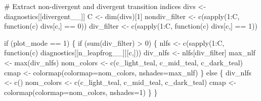 \documentclass[
  letterpaper,
  DIV=11,
  numbers=noendperiod]{scrartcl}
\newenvironment{Shaded}{\begin{snugshade}}{\end{snugshade}}
\newcommand{\BuiltInTok}[1]{\textcolor[rgb]{0.00,0.23,0.31}{#1}}
\newcommand{\CommentTok}[1]{\textcolor[rgb]{0.37,0.37,0.37}{#1}}
\newcommand{\ControlFlowTok}[1]{\textcolor[rgb]{0.00,0.23,0.31}{#1}}
\newcommand{\DecValTok}[1]{\textcolor[rgb]{0.68,0.00,0.00}{#1}}
\newcommand{\NormalTok}[1]{\textcolor[rgb]{0.00,0.23,0.31}{#1}}
\newcommand{\OperatorTok}[1]{\textcolor[rgb]{0.37,0.37,0.37}{#1}}
\newcommand{\StringTok}[1]{\textcolor[rgb]{0.13,0.47,0.30}{#1}}
\begin{document}
\begin{Shaded}
\begin{Highlighting}[]
  \CommentTok{\# Extract non{-}divergent and divergent transition indices}
\NormalTok{  divs }\OperatorTok{\textless{}{-}}\NormalTok{ diagnostics[[}\StringTok{\textquotesingle{}divergent\_\_\textquotesingle{}}\NormalTok{]]}
\NormalTok{  C }\OperatorTok{\textless{}{-}}\NormalTok{ dim(divs)[}\DecValTok{1}\NormalTok{]}
\NormalTok{  nondiv\_filter }\OperatorTok{\textless{}{-}}\NormalTok{ c(sapply(}\DecValTok{1}\NormalTok{:C, function(c) divs[c,] }\OperatorTok{==} \DecValTok{0}\NormalTok{))}
\NormalTok{  div\_filter    }\OperatorTok{\textless{}{-}}\NormalTok{ c(sapply(}\DecValTok{1}\NormalTok{:C, function(c) divs[c,] }\OperatorTok{==} \DecValTok{1}\NormalTok{))}
  
  \ControlFlowTok{if}\NormalTok{ (plot\_mode }\OperatorTok{==} \DecValTok{1}\NormalTok{) \{}
    \ControlFlowTok{if}\NormalTok{ (}\BuiltInTok{sum}\NormalTok{(div\_filter) }\OperatorTok{\textgreater{}} \DecValTok{0}\NormalTok{) \{}
\NormalTok{      nlfs }\OperatorTok{\textless{}{-}}\NormalTok{ c(sapply(}\DecValTok{1}\NormalTok{:C,}
\NormalTok{                       function(c) diagnostics[[}\StringTok{\textquotesingle{}n\_leapfrog\_\_\textquotesingle{}}\NormalTok{]][c,]))}
\NormalTok{      div\_nlfs }\OperatorTok{\textless{}{-}}\NormalTok{ nlfs[div\_filter]}
\NormalTok{      max\_nlf }\OperatorTok{\textless{}{-}} \BuiltInTok{max}\NormalTok{(div\_nlfs)}
\NormalTok{      nom\_colors }\OperatorTok{\textless{}{-}}\NormalTok{ c(c\_light\_teal, c\_mid\_teal, c\_dark\_teal)}
\NormalTok{      cmap }\OperatorTok{\textless{}{-}}\NormalTok{ colormap(colormap}\OperatorTok{=}\NormalTok{nom\_colors, nshades}\OperatorTok{=}\NormalTok{max\_nlf)}
\NormalTok{    \} }\ControlFlowTok{else}\NormalTok{ \{}
\NormalTok{      div\_nlfs }\OperatorTok{\textless{}{-}}\NormalTok{ c()}
\NormalTok{      nom\_colors }\OperatorTok{\textless{}{-}}\NormalTok{ c(c\_light\_teal, c\_mid\_teal, c\_dark\_teal)}
\NormalTok{      cmap }\OperatorTok{\textless{}{-}}\NormalTok{ colormap(colormap}\OperatorTok{=}\NormalTok{nom\_colors, nshades}\OperatorTok{=}\DecValTok{1}\NormalTok{)}
\NormalTok{    \}}
\NormalTok{  \}}


\end{Highlighting}
\end{Shaded}
\end{document}
